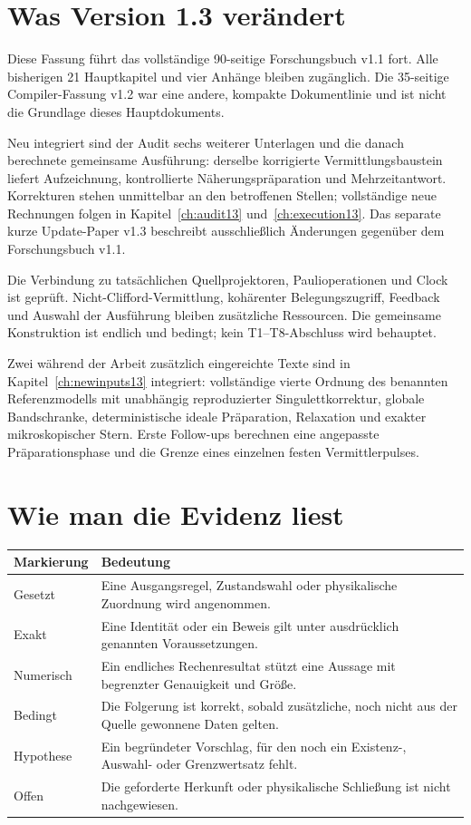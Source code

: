 \documentclass[11pt,a4paper,oneside,parskip=half,headings=normal]{scrreprt}
\begin{document}
\section*{Was Version 1.3 verändert}
Diese Fassung führt das vollständige 90-seitige Forschungsbuch v1.1 fort. Alle bisherigen 21 Hauptkapitel und vier Anhänge bleiben zugänglich. Die 35-seitige Compiler-Fassung v1.2 war eine andere, kompakte Dokumentlinie und ist nicht die Grundlage dieses Hauptdokuments.

Neu integriert sind der Audit sechs weiterer Unterlagen und die danach berechnete gemeinsame Ausführung: derselbe korrigierte Vermittlungsbaustein liefert Aufzeichnung, kontrollierte Näherungspräparation und Mehrzeitantwort. Korrekturen stehen unmittelbar an den betroffenen Stellen; vollständige neue Rechnungen folgen in Kapitel~\ref{ch:audit13} und~\ref{ch:execution13}. Das separate kurze Update-Paper v1.3 beschreibt ausschließlich Änderungen gegenüber dem Forschungsbuch v1.1.

Die Verbindung zu tatsächlichen Quellprojektoren, Paulioperationen und Clock ist geprüft. Nicht-Clifford-Vermittlung, kohärenter Belegungszugriff, Feedback und Auswahl der Ausführung bleiben zusätzliche Ressourcen. Die gemeinsame Konstruktion ist endlich und bedingt; kein T1--T8-Abschluss wird behauptet.

Zwei während der Arbeit zusätzlich eingereichte Texte sind in Kapitel~\ref{ch:newinputs13} integriert: vollständige vierte Ordnung des benannten Referenzmodells mit unabhängig reproduzierter Singulettkorrektur, globale Bandschranke, deterministische ideale Präparation, Relaxation und exakter mikroskopischer Stern. Erste Follow-ups berechnen eine angepasste Präparationsphase und die Grenze eines einzelnen festen Vermittlerpulses.

\section*{Wie man die Evidenz liest}
\par\noindent\begin{tabularx}{\linewidth}{L{27mm}Y}
\toprule
\textbf{Markierung}&\textbf{Bedeutung}\\\midrule
Gesetzt&Eine Ausgangsregel, Zustandswahl oder physikalische Zuordnung wird angenommen.\\
Exakt&Eine Identität oder ein Beweis gilt unter ausdrücklich genannten Voraussetzungen.\\
Numerisch&Ein endliches Rechenresultat stützt eine Aussage mit begrenzter Genauigkeit und Größe.\\
Bedingt&Die Folgerung ist korrekt, sobald zusätzliche, noch nicht aus der Quelle gewonnene Daten gelten.\\
Hypothese&Ein begründeter Vorschlag, für den noch ein Existenz-, Auswahl- oder Grenzwertsatz fehlt.\\
Offen&Die geforderte Herkunft oder physikalische Schließung ist nicht nachgewiesen.\\\bottomrule
\end{tabularx}\par
\end{document}
